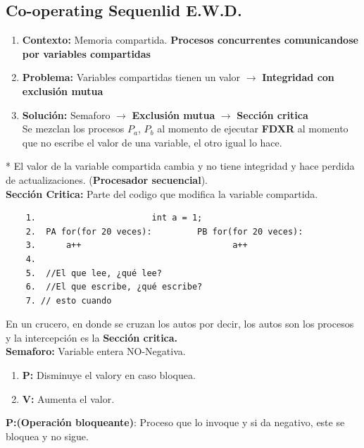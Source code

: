 \documentclass[12pt]{article}
\begin{document}
{\color{blue} \subsection*{\textbf{Co-operating Sequenlid E.W.D.}}}
\vspace{1em}
\begin{enumerate}
    \item {\color{red}\textbf{Contexto:}} Memoria compartida. \textbf{Procesos concurrentes comunicandose por variables compartidas}
    \item {\color{red}\textbf{Problema:}} Variables compartidas tienen un valor $\rightarrow$ \textbf{Integridad con exclusión mutua} 
    \item {\color{red}\textbf{Solución:}} Semaforo $\rightarrow$ \textbf{Exclusión mutua} $\rightarrow$ \textbf{Sección critica}\\
    Se mezclan los procesos $P_a$, $P_b$ al momento de ejecutar \textbf{FDXR} al momento que no escribe el valor de una variable, el otro igual lo hace.\\

\end{enumerate}

* El valor de la variable compartida cambia y no tiene integridad y hace perdida de actualizaciones. ({\textbf{Procesador secuencial}}).\\

\textbf{Sección Critica:} Parte del codigo que modifica la variable compartida.

\begin{verbatim}
    1.                       int a = 1;
    2.  PA for(for 20 veces):         PB for(for 20 veces):
    3.      a++                              a++
    4. 
    5.  //El que lee, ¿qué lee?
    6.  //El que escribe, ¿qué escribe?
    7. // esto cuando 
\end{verbatim}

En un crucero, en donde se cruzan los autos por decir, los autos son los procesos y la intercepción es la \textbf{Sección critica.}\\

\textbf{Semaforo:} Variable entera NO-Negativa.
\begin{enumerate}
    \item \textbf{P:} Disminuye el valory en caso bloquea.
    \item \textbf{V:} Aumenta el valor.
\end{enumerate}

\textbf{P:(Operación bloqueante)}: Proceso que lo invoque y si da negativo, este se bloquea y no sigue.
\end{document}
